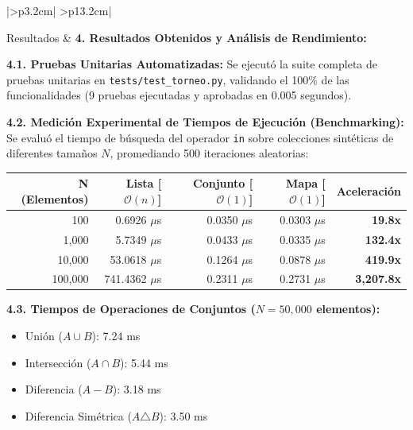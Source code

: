 \documentclass[11pt,a4paper]{article}
\begin{document}
\begin{longtable}{
    |>{\bfseries\centering\arraybackslash}p{3.2cm}|
    >{\setlength{\parindent}{0cm}}p{13.2cm}|
}
\hline


Resultados
&
\textbf{4. Resultados Obtenidos y Análisis de Rendimiento:}\newline

\textbf{4.1. Pruebas Unitarias Automatizadas:}\newline
Se ejecutó la suite completa de pruebas unitarias en \texttt{tests/test\_torneo.py}, validando el 100\% de las funcionalidades (9 pruebas ejecutadas y aprobadas en 0.005 segundos).

\textbf{4.2. Medición Experimental de Tiempos de Ejecución (Benchmarking):}\newline
Se evaluó el tiempo de búsqueda del operador \texttt{in} sobre colecciones sintéticas de diferentes tamaños $N$, promediando 500 iteraciones aleatorias:

\begin{center}
\small
\begin{tabular}{|r|r|r|r|r|}
\hline
\rowcolor{gray!20}
\textbf{N (Elementos)} & \textbf{Lista [$\mathcal{O}(n)$]} & \textbf{Conjunto [$\mathcal{O}(1)$]} & \textbf{Mapa [$\mathcal{O}(1)$]} & \textbf{Aceleración} \\
\hline
100 & 0.6926 $\mu$s & 0.0350 $\mu$s & 0.0303 $\mu$s & \textbf{19.8x} \\
1,000 & 5.7349 $\mu$s & 0.0433 $\mu$s & 0.0335 $\mu$s & \textbf{132.4x} \\
10,000 & 53.0618 $\mu$s & 0.1264 $\mu$s & 0.0878 $\mu$s & \textbf{419.9x} \\
100,000 & 741.4362 $\mu$s & 0.2311 $\mu$s & 0.2731 $\mu$s & \textbf{3,207.8x} \\
\hline
\end{tabular}
\end{center}

\textbf{4.3. Tiempos de Operaciones de Conjuntos ($N = 50,000$ elementos):}\newline
\begin{itemize}
    \item Unión ($A \cup B$): 7.24 ms
    \item Intersección ($A \cap B$): 5.44 ms
    \item Diferencia ($A - B$): 3.18 ms
    \item Diferencia Simétrica ($A \triangle B$): 3.50 ms
\end{itemize}


\end{longtable}
\end{document}
